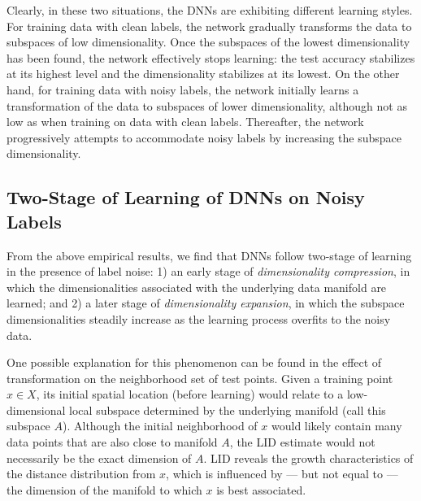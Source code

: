 \documentclass{article}
\begin{document}
Clearly, in these two situations, the DNNs are exhibiting different learning styles. For training data with clean labels, the network gradually transforms the data to subspaces of low dimensionality. Once the subspaces of the lowest dimensionality has been found, the network effectively stops learning: the test accuracy stabilizes at its highest level and the dimensionality stabilizes at its lowest. On the other hand, for training data with noisy labels, the network initially learns a transformation of the data to subspaces of lower dimensionality, although not as low as when training on data with clean labels. Thereafter, the network progressively attempts to accommodate noisy labels by increasing the subspace dimensionality. 

\subsection{Two-Stage of Learning of DNNs on Noisy Labels}
From the above empirical results, we find that DNNs follow two-stage of learning in the presence of label noise: 1) an early stage of {\em dimensionality compression}, in which the dimensionalities associated with the underlying data manifold are learned; and 2) a later stage of {\em dimensionality expansion}, in which the subspace dimensionalities steadily increase as the learning process overfits to the noisy data. 

One possible explanation for this phenomenon can be found in the effect of transformation on the neighborhood set of test points.
Given a training point $x\in X$, its initial spatial location (before learning) would relate to a low-dimensional local subspace determined by the underlying manifold (call this subspace $A$). 
Although the initial neighborhood of $x$ would likely contain many data points that are also close to manifold $A$, the LID estimate would not
necessarily be the exact dimension of $A$. LID reveals the growth characteristics of the distance distribution from $x$, which is influenced by --- but not equal to --- the dimension of the manifold to which $x$ is best associated.
\end{document}

